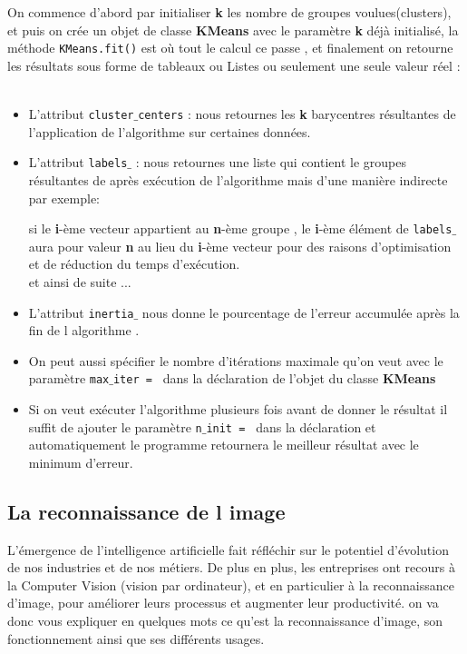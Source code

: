 \documentclass[a4paper,12pt]{report}
\begin{document}
\newpage
 On commence d'abord par initialiser \textbf{k} les nombre de groupes voulues(clusters), et puis on crée un objet de classe \textbf{KMeans} avec le paramètre \textbf{k} déjà initialisé, la méthode \texttt{KMeans.fit()} est où tout le calcul ce passe , et finalement on retourne les résultats sous forme de tableaux ou Listes ou seulement une seule valeur réel : \\\\
 \begin{itemize}
     \item L'attribut \texttt{cluster$\_$centers} : nous retournes les \textbf{k} barycentres résultantes de l'application de l'algorithme sur certaines données.\\
     
     \item L'attribut \texttt{labels$\_$} : nous retournes une liste qui contient le groupes résultantes de après exécution de l'algorithme mais d'une manière indirecte par exemple:
     
     si le \textbf{i}-ème vecteur appartient au \textbf{n}-ème groupe , le \textbf{i}-ème élément de \texttt{labels$\_$} aura pour valeur \textbf{n} au lieu du \textbf{i}-ème vecteur pour des raisons d'optimisation et de réduction du temps d'exécution.\\
     et ainsi de suite ...\\
     
     \item L'attribut \texttt{inertia$\_$} nous donne le pourcentage de l'erreur accumulée après la fin de l algorithme .\\
     
     \item On peut aussi spécifier le nombre d'itérations maximale qu'on veut avec le paramètre  \texttt{max$\_$iter = } dans la déclaration de l'objet du classe \textbf{KMeans}\\
     
     \item Si on veut exécuter l'algorithme plusieurs fois avant de donner le résultat il suffit de ajouter le paramètre \texttt{n$\_$init = } dans la déclaration et automatiquement le programme retournera le meilleur résultat avec le minimum d'erreur.
     
 \end{itemize} 

\subsection{La reconnaissance de l image}
L’émergence de l’intelligence artificielle fait réfléchir sur le potentiel d’évolution de nos industries et de nos métiers. De plus en plus, les entreprises ont recours à la Computer Vision (vision par ordinateur), et en particulier à la reconnaissance d’image, pour améliorer leurs processus et augmenter leur productivité. on va donc vous expliquer en quelques mots ce qu’est la reconnaissance d’image, son fonctionnement ainsi que ses différents usages.
\end{document}
